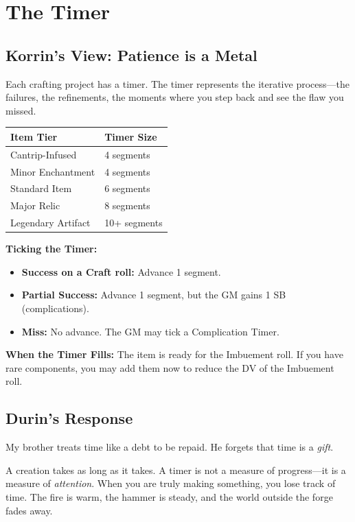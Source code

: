 \documentclass[11pt]{book}
\begin{document}
\newpage
\section{The Timer}

\subsection*{Korrin's View: Patience is a Metal}

Each crafting project has a timer. The timer represents the iterative process---the failures, the refinements, the moments where you step back and see the flaw you missed.

\begin{table}[h]
\centering
\begin{tabular}{@{}ll@{}}
\toprule
\textbf{Item Tier} & \textbf{Timer Size} \\
\midrule
Cantrip-Infused & 4 segments \\
Minor Enchantment & 4 segments \\
Standard Item & 6 segments \\
Major Relic & 8 segments \\
Legendary Artifact & 10+ segments \\
\bottomrule
\end{tabular}
\end{table}

\textbf{Ticking the Timer:}
\begin{itemize}
    \item \textbf{Success on a Craft roll:} Advance 1 segment.
    \item \textbf{Partial Success:} Advance 1 segment, but the GM gains 1 SB (complications).
    \item \textbf{Miss:} No advance. The GM may tick a Complication Timer.
\end{itemize}

\textbf{When the Timer Fills:} The item is ready for the Imbuement roll. If you have rare components, you may add them now to reduce the DV of the Imbuement roll.

\subsection*{Durin's Response}

My brother treats time like a debt to be repaid. He forgets that time is a \textit{gift}.

A creation takes as long as it takes. A timer is not a measure of progress---it is a measure of \textit{attention}. When you are truly making something, you lose track of time. The fire is warm, the hammer is steady, and the world outside the forge fades away.
\end{document}
